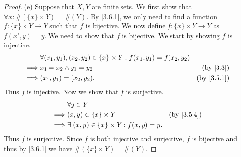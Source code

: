 \begin{proof}{(e)}
  Suppose that \(X, Y\) are finite sets.
  We first show that \(\forall x : \#(\{x\} \times Y) = \#(Y)\).
  By \cref{3.6.1}, we only need to find a function \(f : \{x\} \times Y \to Y\) such that \(f\) is bijective.
  We now define \(f : \{x\} \times Y \to Y\) as \(f(x', y) = y\).
  We need to show that \(f\) is bijective.
  We start by showing \(f\) is injective.
  \begin{align*}
             & \forall (x_1, y_1), (x_2, y_2) \in \{x\} \times Y : f(x_1, y_1) = f(x_2, y_2)                            \\
    \implies & x_1 = x_2 \land y_1 = y_2                                                     & \text{(by \cref{3.3})}   \\
    \implies & (x_1, y_1) = (x_2, y_2).                                                      & \text{(by \cref{3.5.1})}
  \end{align*}
  Thus \(f\) is injective.
  Now we show that \(f\) is surjective.
  \begin{align*}
             & \forall y \in Y                                                              \\
    \implies & (x, y) \in \{x\} \times Y                         & \text{(by \cref{3.5.4})} \\
    \implies & \exists\ (x, y) \in \{x\} \times Y : f(x, y) = y.
  \end{align*}
  Thus \(f\) is surjective.
  Since \(f\) is both injective and surjective, \(f\) is bijective and thus by \cref{3.6.1} we have \(\#(\{x\} \times Y) = \#(Y)\).


\end{proof}
